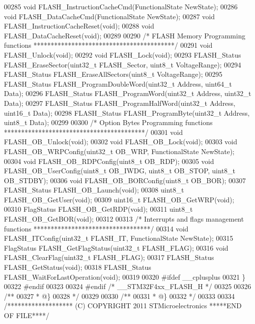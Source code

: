 \begin{DoxyCode}
00285 \textcolor{keywordtype}{void} FLASH_InstructionCacheCmd(FunctionalState NewState);
00286 \textcolor{keywordtype}{void} FLASH_DataCacheCmd(FunctionalState NewState);
00287 \textcolor{keywordtype}{void} FLASH_InstructionCacheReset(\textcolor{keywordtype}{void});
00288 \textcolor{keywordtype}{void} FLASH_DataCacheReset(\textcolor{keywordtype}{void});
00289 
00290 \textcolor{comment}{/* FLASH Memory Programming functions *****************************************/}
00291 \textcolor{keywordtype}{void} FLASH_Unlock(\textcolor{keywordtype}{void});
00292 \textcolor{keywordtype}{void} FLASH_Lock(\textcolor{keywordtype}{void});
00293 FLASH\_Status FLASH_EraseSector(uint32\_t FLASH\_Sector, uint8\_t VoltageRange);
00294 FLASH\_Status FLASH_EraseAllSectors(uint8\_t VoltageRange);
00295 FLASH\_Status FLASH_ProgramDoubleWord(uint32\_t Address, uint64\_t Data);
00296 FLASH\_Status FLASH_ProgramWord(uint32\_t Address, uint32\_t Data);
00297 FLASH\_Status FLASH_ProgramHalfWord(uint32\_t Address, uint16\_t Data);
00298 FLASH\_Status FLASH_ProgramByte(uint32\_t Address, uint8\_t Data);
00299 
00300 \textcolor{comment}{/* Option Bytes Programming functions *****************************************/}
00301 \textcolor{keywordtype}{void} FLASH_OB_Unlock(\textcolor{keywordtype}{void});
00302 \textcolor{keywordtype}{void} FLASH_OB_Lock(\textcolor{keywordtype}{void});
00303 \textcolor{keywordtype}{void} FLASH_OB_WRPConfig(uint32\_t OB\_WRP, FunctionalState NewState);
00304 \textcolor{keywordtype}{void} FLASH_OB_RDPConfig(uint8\_t OB\_RDP);
00305 \textcolor{keywordtype}{void} FLASH_OB_UserConfig(uint8\_t OB\_IWDG, uint8\_t OB\_STOP, uint8\_t OB\_STDBY);
00306 \textcolor{keywordtype}{void} FLASH_OB_BORConfig(uint8\_t OB\_BOR);
00307 FLASH\_Status FLASH_OB_Launch(\textcolor{keywordtype}{void});
00308 uint8\_t FLASH_OB_GetUser(\textcolor{keywordtype}{void});
00309 uint16\_t FLASH_OB_GetWRP(\textcolor{keywordtype}{void});
00310 FlagStatus FLASH_OB_GetRDP(\textcolor{keywordtype}{void});
00311 uint8\_t FLASH_OB_GetBOR(\textcolor{keywordtype}{void});
00312 
00313 \textcolor{comment}{/* Interrupts and flags management functions **********************************/}
00314 \textcolor{keywordtype}{void} FLASH_ITConfig(uint32\_t FLASH\_IT, FunctionalState NewState);
00315 FlagStatus FLASH_GetFlagStatus(uint32\_t FLASH\_FLAG);
00316 \textcolor{keywordtype}{void} FLASH_ClearFlag(uint32\_t FLASH\_FLAG);
00317 FLASH\_Status FLASH_GetStatus(\textcolor{keywordtype}{void});
00318 FLASH\_Status FLASH_WaitForLastOperation(\textcolor{keywordtype}{void});
00319 
00320 \textcolor{preprocessor}{#}\textcolor{preprocessor}{ifdef} \_\_cplusplus
00321 \}
00322 \textcolor{preprocessor}{#}\textcolor{preprocessor}{endif}
00323 
00324 \textcolor{preprocessor}{#}\textcolor{preprocessor}{endif} \textcolor{comment}{/* \_\_STM32F4xx\_FLASH\_H */}
00325 
00326 \textcolor{comment}{/**}
00327 \textcolor{comment}{  * @\}}
00328 \textcolor{comment}{  */}
00329 
00330 \textcolor{comment}{/**}
00331 \textcolor{comment}{  * @\}}
00332 \textcolor{comment}{  */}
00333 
00334 \textcolor{comment}{/******************* (C) COPYRIGHT 2011 STMicroelectronics *****END OF FILE****/}
\end{DoxyCode}

